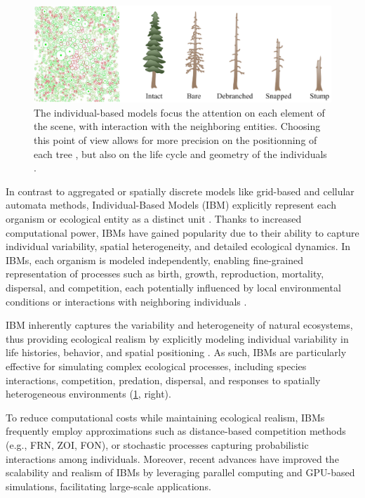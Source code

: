 \begin{figure}[H]
    \centering
    \includegraphics[width= .8 \linewidth]{individual-based-modeling-teaser.png}
    \caption{The individual-based models focus the attention on each element of the scene, with interaction with the neighboring entities. Choosing this point of view allows for more precision on the positionning of each tree \cite{Alsweis2006}, but also on the life cycle and geometry of the individuals \cite{Peytavie2024a}. }
    \label{fig:env-obj_individual-based-models}    
\end{figure}

In contrast to aggregated or spatially discrete models like grid-based and cellular automata methods, Individual-Based Models (IBM) explicitly represent each organism or ecological entity as a distinct unit \cite{Crooks2017}. Thanks to increased computational power, IBMs have gained popularity due to their ability to capture individual variability, spatial heterogeneity, and detailed ecological dynamics. In IBMs, each organism is modeled independently, enabling fine-grained representation of processes such as birth, growth, reproduction, mortality, dispersal, and competition, each potentially influenced by local environmental conditions or interactions with neighboring individuals \cite{Chng2013,Peytavie2024a}.

IBM inherently captures the variability and heterogeneity of natural ecosystems, thus providing ecological realism by explicitly modeling individual variability in life histories, behavior, and spatial positioning \cite{McLane2011,Zhang2020}. As such, IBMs are particularly effective for simulating complex ecological processes, including species interactions, competition, predation, dispersal, and responses to spatially heterogeneous environments  (\cref{fig:env-obj_individual-based-models}, right).

To reduce computational costs while maintaining ecological realism, IBMs frequently employ approximations such as distance-based competition methods (e.g., FRN, ZOI, FON), or stochastic processes capturing probabilistic interactions among individuals. Moreover, recent advances have improved the scalability and realism of IBMs by leveraging parallel computing and GPU-based simulations, facilitating large-scale applications.

